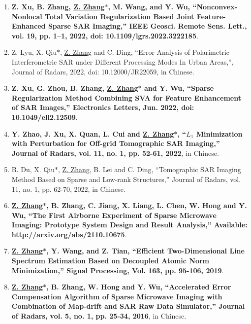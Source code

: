 \documentclass[paper=a4,fontsize=11pt]{scrartcl}
\begin{document}
\begin{enumerate}
\item \textbf{Z. Xu, B. Zhang, \underline{Z. Zhang$\ast$}, M. Wang, and Y. Wu, ``Nonconvex-Nonlocal Total Variation Regularization Based Joint Feature-Enhanced Sparse SAR Imaging,'' IEEE Geosci. Remote Sens. Lett., vol. 19, pp. 1–1, 2022, doi: 10.1109/lgrs.2022.3222185}.

\item Z. Lyu, X. Qiu$\ast$, \underline{Z. Zhang} and C. Ding, ``Error Analysis of Polarimetric Interferometric SAR under Different Processing Modes In Urban Areas,'', Journal of Radars, 2022, doi: 10.12000/JR22059, in Chinese.

\item \textbf{Z. Xu, G. Zhou, B. Zhang, \underline{Z. Zhang$\ast$} and Y. Wu, ``Sparse Regularization Method Combining SVA for Feature Enhancement of SAR Images,'' Electronics Letters, Jun. 2022, doi: 10.1049/ell2.12509}.

\item \textbf{Y. Zhao, J. Xu, X. Quan, L. Cui and \underline{Z. Zhang$\ast$}, ``$L_1$ Minimization with Perturbation for Off-grid Tomographic SAR Imaging,'' Journal of Radars, vol. 11, no. 1, pp. 52-61, 2022}, in Chinese.

\item B. Du, X. Qiu$\ast$, \underline{Z. Zhang}, B. Lei and C. Ding, ``Tomographic SAR Imaging Method Based on Sparse and Low-rank Structures,'' Journal of Radars, vol. 11, no. 1, pp. 62-70, 2022, in Chinese.


\item \textbf{\underline{Z. Zhang$\ast$}, B. Zhang, C. Jiang, X. Liang, L. Chen, W. Hong and Y. Wu, ``The First Airborne Experiment of Sparse Microwave Imaging: Prototype System Design and Result Analysis,'' Available: http://arxiv.org/abs/2110.10675}.

\item \textbf{\underline{Z. Zhang$\ast$}, Y. Wang, and Z. Tian, ``Efficient Two-Dimensional Line Spectrum Estimation Based on Decoupled Atomic Norm Minimization,'' Signal Processing, Vol. 163, pp. 95-106, 2019}.



\item \textbf{\underline{Z. Zhang$\ast$}, B. Zhang, W. Hong and Y. Wu, ``Accelerated Error Compensation Algorithm of Sparse Microwave Imaging with Combination of Map-drift and SAR Raw Data Simulator,'' Journal of Radars, vol. 5, no. 1, pp. 25-34, 2016}, in Chinese.


\end{enumerate}
\end{document}
